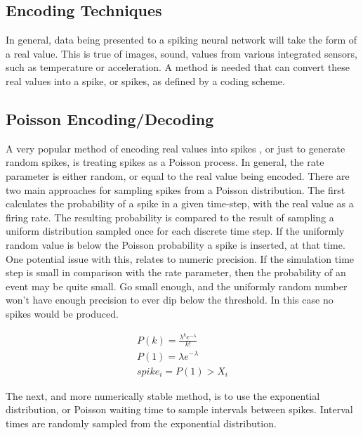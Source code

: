     \subsection{Encoding Techniques}
    In general, data being presented to a spiking neural network will take the
    form of a real value. This is true of images, sound, values from various
    integrated sensors, such as temperature or acceleration. A method is needed
    that can convert these real values into a spike, or spikes, as defined by a
    coding scheme.
    
    \subsection{Poisson Encoding/Decoding}
    A very popular method of encoding real values into spikes , or just to
    generate random spikes, is treating spikes as a Poisson process. In general,
    the rate parameter is either random, or equal to the real value being
    encoded. There are two main approaches for sampling spikes from a Poisson
    distribution. The first calculates the probability of a spike in a given
    time-step, with the real value as a firing rate. The resulting probability
    is compared to the result of sampling a uniform distribution sampled once
    for each discrete time step. If the uniformly random value is below the
    Poisson probability a spike is inserted, at that time. One potential issue
    with this, relates to numeric precision. If the simulation time step is
    small in comparison with the rate parameter, then the probability of an
    event may be quite small. Go small enough, and the uniformly random number
    won't have enough precision to ever dip below the threshold. In this case no
    spikes would be produced.
    
    
    \begin{align}
        P(k) = \frac{\lambda^k e^{-\lambda}}{k!} \\ P(1) = \lambda e^{-\lambda}
        \\ spike_i = P(1) > X_i
    \end{align}
    
    The next, and more numerically stable method, is to use the exponential
    distribution, or Poisson waiting time to sample intervals between
    spikes. Interval times are randomly sampled from the exponential
    distribution.
    
